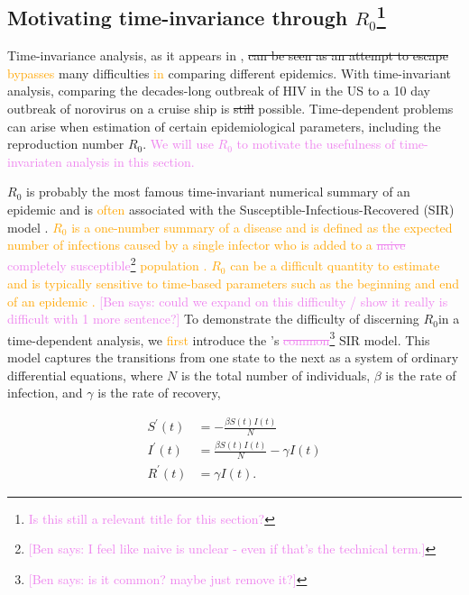 \documentclass[
  shortnames]{jss}
\begin{document}
\subsection[motivating through R0]{Motivating time-invariance through
\(R_0\)\footnote{\textcolor{violet}{Is this still a relevant title for this section?}}}\label{r0}

Time-invariance analysis, as it appears in ,
\sout{can be seen as an attempt to escape} \textcolor{orange}{bypasses}
many difficulties \textcolor{orange}{in} comparing different epidemics.
With time-invariant analysis, comparing the decades-long outbreak of HIV
in the US to a 10 day outbreak of norovirus on a cruise ship is
\sout{still} possible. Time-dependent problems can arise when estimation
of certain epidemiological parameters, including the reproduction number
\(R_0\).
\textcolor{violet}{We will use $R_0$ to motivate the usefulness of time-invariaten analysis in this section.}

\(R_0\) is probably the most famous time-invariant numerical summary of
an epidemic and is \textcolor{orange}{often} associated with the
Susceptible-Infectious-Recovered (SIR) model \citep{hethcote2001}.
\textcolor{orange}{$R_0$ is a one-number summary of a disease and is defined as the expected number of infections caused by a single infector who is added to a \textcolor{violet}{\sout{naive} completely susceptible}\footnote{\textcolor{violet}{[Ben says: I feel like naive is unclear - even if that's the technical term.]}} population \citep{anderson1992}. $R_0$ can be a difficult quantity to estimate and is typically sensitive to time-based parameters such as the beginning and end of an epidemic \citep{Gallagher2020}. }\textcolor{violet}{[Ben says: could we expand on this difficulty / show it really is difficult with 1 more sentence?]}
To demonstrate the difficulty of discerning \(R_0\)in a time-dependent
analysis, we \textcolor{orange}{first} introduce the
\citet{Kermack1927}'s
\textcolor{violet}{\sout{common}}\footnote{\textcolor{violet}{[Ben says: is it common? maybe just remove it?]}}
SIR model. This model captures the transitions from one state to the
next as a system of ordinary differential equations, where \(N\) is the
total number of individuals, \(\beta\) is the rate of infection, and
\(\gamma\) is the rate of recovery,

\begin{align}\label{eq:sir-ode}
    S^\prime(t) &= -\frac{\beta S(t)I(t)}{N} \\
    I^\prime(t) &= \frac{\beta S(t)I(t)}{N} - \gamma I(t) \nonumber\\
    R^\prime(t) &= \gamma I(t) \nonumber.
\end{align}
\end{document}
